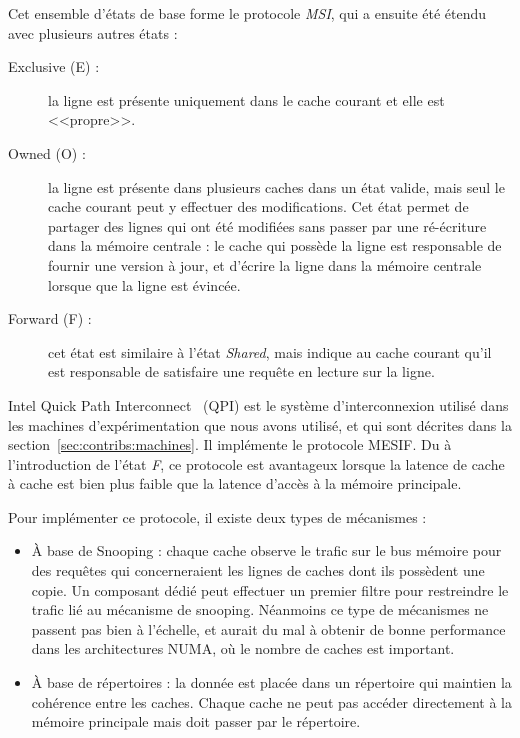 Cet ensemble d'états de base forme le protocole \emph{MSI}, qui a ensuite été étendu avec plusieurs autres états :

\begin{description}
  \item [Exclusive (E) :] la ligne est présente uniquement dans le cache courant et elle est <<propre>>.
  \item [Owned (O) :] la ligne est présente dans plusieurs caches dans un état valide, mais seul le cache courant peut y effectuer des modifications.
    Cet état permet de partager des lignes qui ont été modifiées sans passer par une ré-écriture dans la mémoire centrale : le cache qui possède la ligne est responsable de fournir une version à jour, et d'écrire la ligne dans la mémoire centrale lorsque que la ligne est évincée.
  \item [Forward (F) :] cet état est similaire à l'état \emph{Shared}, mais indique au cache courant qu'il est responsable de satisfaire une requête en lecture sur la ligne.
\end{description}

Intel Quick Path Interconnect~\cite{Ziakas2010} (QPI) est le système d'interconnexion utilisé dans les machines d'expérimentation que nous avons utilisé, et qui sont décrites dans la section~\ref{sec:contribs:machines}.
Il implémente le protocole MESIF. Du à l'introduction de l'état \emph{F}, ce protocole est avantageux lorsque la latence de cache à cache est bien plus faible que la latence d'accès à la mémoire principale.

Pour implémenter ce protocole, il existe deux types de mécanismes :

\begin{itemize}
  \item À base de Snooping : chaque cache observe le trafic sur le bus mémoire pour des requêtes qui concerneraient les lignes de caches dont ils possèdent une copie. Un composant dédié peut effectuer un premier filtre pour restreindre le trafic lié au mécanisme de snooping. Néanmoins ce type de mécanismes ne passent pas bien à l'échelle, et aurait du mal à obtenir de bonne performance dans les architectures NUMA, où le nombre de caches est important.

  \item À base de répertoires : la donnée est placée dans un répertoire qui maintien la cohérence entre les caches. Chaque cache ne peut pas accéder directement à la mémoire principale mais doit passer par le répertoire.
\end{itemize}

